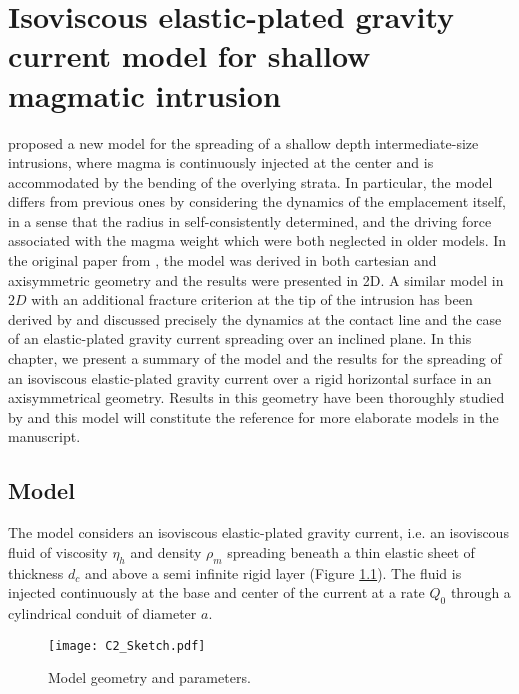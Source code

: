 \chapter{Isoviscous elastic-plated  gravity current model  for shallow
  magmatic intrusion}

\label{chap2} 
\minitoc

\citet{Michaut:2011kg} proposed  a new  model for  the spreading  of a
shallow   depth   intermediate-size   intrusions,   where   magma   is
continuously injected at the center and is accommodated by the bending
of  the  overlying strata.   In  particular,  the model  differs  from
previous ones by  considering the dynamics of  the emplacement itself,
in a  sense that the  radius in self-consistently determined,  and the
driving  force  associated  with  the magma  weight  which  were  both
neglected   in   older   models.    In   the   original   paper   from
\citet{Michaut:2011kg}, the  model was  derived in both  cartesian and
axisymmetric geometry and the results  were presented in 2D. A similar
model in $2D$ with an additional  fracture criterion at the tip of the
intrusion    has   been    derived   by    \citet{Bunger:2011cb}   and
\citet{Anonymous:QWXp_4JV}  discussed precisely  the  dynamics at  the
contact  line  and  the  case of  an  elastic-plated  gravity  current
spreading  over an  inclined plane.   In  this chapter,  we present  a
summary  of  the  model  and  the results  for  the  spreading  of  an
isoviscous  elastic-plated gravity  current  over  a rigid  horizontal
surface in an axisymmetrical geometry.   Results in this geometry have
been thoroughly  studied by \citet{Lister:2013ia} and  this model will
constitute the reference for more elaborate models in the manuscript.

\section{Model}
\label{C2-sec:model}

The model considers an isoviscous elastic-plated gravity current, i.e.
an  isoviscous  fluid  of  viscosity  $\eta_h$  and  density  $\rho_m$
spreading beneath a thin elastic sheet  of thickness $d_c$ and above a
semi infinite rigid layer \citep{Michaut:2011kg,Bunger:2011cb} (Figure
\ref{C2-Sketch}).  The fluid is injected  continuously at the base and
center of the current at a rate $Q_0$ through a cylindrical conduit of
diameter $a$.

\begin{figure}[h!]
  \begin{center}
    \graphicspath{ {/Users/thorey/Documents/These/Manuscript/Figure/Chapter2/} }
    \texttt{[image: C2\_Sketch.pdf]}
    \caption{Model geometry and parameters.}
    \label{C2-Sketch}
  \end{center}
\end{figure}

